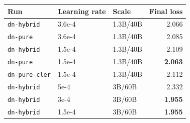 \begin{tabular}{lllr}
\toprule
Run & Learning rate & Scale & Final loss \\
\midrule
\texttt{dn-hybrid} & 3.6e-4 & 1.3B/40B & 2.066 \\
\texttt{dn-pure} & 3.6e-4 & 1.3B/40B & 2.085 \\
\texttt{dn-hybrid} & 1.5e-4 & 1.3B/40B & 2.109 \\
\texttt{dn-pure} & 1.5e-4 & 1.3B/40B & \textbf{2.063} \\
\texttt{dn-pure-cler} & 1.5e-4 & 1.3B/40B & 2.112 \\
\midrule
\texttt{dn-hybrid} & 5e-4 & 3B/60B & 2.332 \\
\texttt{dn-hybrid} & 3e-4 & 3B/60B & \textbf{1.955} \\
\texttt{dn-hybrid} & 1.5e-4 & 3B/60B & \textbf{1.955} \\
\bottomrule
\end{tabular}
